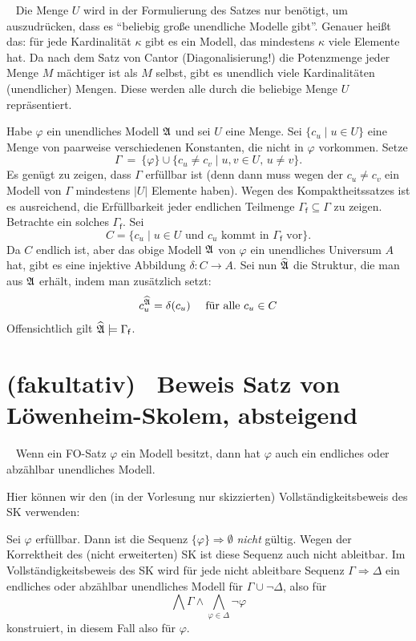 \documentclass[fontsize=11pt, twoside=false, numbers=autoenddot]{scrbook}
\begin{document}
\enlargethispage*{10mm}
\par\medskip\noindent
{}~
Die Menge $U$ wird in der Formulierung des Satzes nur benötigt,
um auszudrücken, dass es "`beliebig große unendliche Modelle gibt"'.
Genauer heißt das: für jede Kardinalität $\kappa$ gibt es ein Modell,
das mindestens $\kappa$ viele Elemente hat.
Da nach dem Satz von Cantor (Diagonalisierung!) 
die Potenzmenge jeder Menge $M$ mächtiger ist als $M$ selbst,
gibt es unendlich viele Kardinalitäten (unendlicher) Mengen.
Diese werden alle durch die beliebige Menge $U$ repräsentiert.
%
\begin{beweis}
  Habe $\varphi$ ein unendliches Modell $\mathfrak{A}$ und sei $U$ eine Menge.
  Sei $\{c_u \mid u \in U\}$ eine Menge von paarweise verschiedenen Konstanten,
  die nicht in $\varphi$ vorkommen.
  Setze
  \[
    \tag{$*$}
    \Gamma ~=~ \{\varphi\} \cup \{c_u \neq c_v \mid u,v \in U,\, u \neq v\}.
  \]
  Es genügt zu zeigen, dass $\Gamma$ erfüllbar ist
  (denn dann muss wegen der $c_u \neq c_v$
  ein Modell von $\Gamma$ mindestens $|U|$ Elemente haben).
  Wegen des Kompaktheitssatzes ist es ausreichend,
  die Erfüllbarkeit jeder endlichen Teilmenge $\Gamma_{\textsf{f}} \subseteq \Gamma$
  zu zeigen.
  Betrachte ein solches $\Gamma_{\textsf{f}}$.
  Sei
  \[
    C = \{c_u \mid u \in U \text{~und $c_u$ kommt in $\Gamma_{\textsf{f}}$ vor}\}.
  \]
  Da $C$ endlich ist, aber das obige Modell $\mathfrak{A}$ von $\varphi$ ein unendliches
  Universum $A$ hat,
  gibt es eine injektive Abbildung
  $
    \delta : C \to A.
  $
  Sei nun $\widehat{\mathfrak{A}}$ die Struktur, die man aus $\mathfrak{A}$ erhält, indem man zusätzlich setzt:
  \[
    c_u^{\widehat{\mathfrak{A}}} = \delta(c_u)\quad \text{~für alle~} c_u \in C
  \]
  Offensichtlich gilt $\widehat{\mathfrak{A}} \models \Gamma_{\textsf{f}}$.
  \qedhere
\end{beweis}%
\goodbreak

\section*{(fakultativ)~ Beweis Satz von Löwenheim-Skolem, absteigend}

~
Wenn ein FO-Satz $\varphi$ ein Modell besitzt,
dann hat $\varphi$ auch ein endliches oder abz\"ahlbar unendliches Modell.
%
\begin{beweis}
  Hier können wir den (in der Vorlesung nur skizzierten)
  Vollständigkeitsbeweis des SK verwenden:

  Sei $\varphi$ erfüllbar.
  Dann ist die Sequenz $\{\varphi\} \Rightarrow \emptyset$
  \emph{nicht} gültig.
  Wegen der Korrektheit des (nicht erweiterten) SK ist diese Sequenz
  auch nicht ableitbar.
  Im Vollständigkeitsbeweis des SK wird für jede nicht ableitbare Sequenz
  $\Gamma \Rightarrow \Delta$
  ein endliches oder abzählbar unendliches Modell für $\Gamma \cup \lnot \Delta$,
  also für
  \[
    \bigwedge \Gamma \land \bigwedge_{\varphi \in \Delta} \lnot \varphi
  \]
  konstruiert, in diesem Fall also für $\varphi$.
  \qedhere
\end{beweis}%
\end{document}
